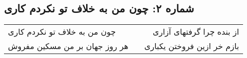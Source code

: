 \begin{center}
\section*{شماره ۲: چون من به خلاف تو نکردم کاری}
\label{sec:002}
\begin{longtable}{l p{0.5cm} r}
چون من به خلاف تو نکردم کاری
&&
از بنده چرا گرفتهای آزاری
\\
هر روز جهان بر من مسکین مفروش
&&
بازم خر ازین فروختن یکباری
\\
\end{longtable}
\end{center}
